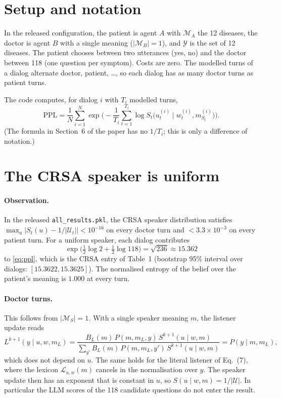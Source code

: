 \documentclass[11pt,a4paper]{article}
\newcommand{\code}[1]{\texttt{\small #1}}
\begin{document}
\section{Setup and notation}

In the released configuration, the patient is agent $A$ with $\mathcal{M}_A$ the 12 diseases, the
doctor is agent $B$ with a single meaning ($|\mathcal{M}_B| = 1$), and $\mathcal{Y}$ is the set of
12 diseases. The patient chooses between two utterances (yes, no) and the doctor between 118
(one question per symptom). Costs are zero. The modelled turns of a dialog
alternate doctor, patient, \dots, so each dialog has as many doctor turns as patient turns.

The code computes, for dialog $i$ with $T_i$ modelled turns,
\begin{equation}
\mathrm{PPL} = \frac{1}{N} \sum_{i=1}^{N} \exp\Big( -\frac{1}{T_i} \sum_{t=1}^{T_i}
\log S_t\big(u_t^{(i)} \mid w_t^{(i)}, m_{S_t}^{(i)}\big) \Big).
\label{eq:ppl}
\end{equation}
(The formula in Section~6 of the paper has no $1/T_i$; this is only a difference of notation.)

\section{The CRSA speaker is uniform}
\label{sec:uniform}

\paragraph{Observation.} In the released \code{all\_results.pkl}, the CRSA speaker distribution
satisfies $\max_u |S_t(u) - 1/|\mathcal{U}_t|| < 10^{-16}$ on every doctor turn and
$< 3.3 \times 10^{-3}$ on every patient turn. For a uniform speaker, each dialog contributes
\[
\exp\big( \tfrac12 \log 2 + \tfrac12 \log 118 \big) = \sqrt{236} \approx 15.362
\]
to \eqref{eq:ppl}, which is the CRSA entry of Table~1 (bootstrap 95\% interval over dialogs:
$[15.3622, 15.3625]$). The normalised entropy of the belief over the patient's meaning is $1.000$ at every turn.

\paragraph{Doctor turns.} This follows from $|\mathcal{M}_S| = 1$. With a single speaker meaning
$m$, the listener update reads
\[
L^{k+1}(y \mid u, w, m_L) = \frac{B_L(m)\, P(m, m_L, y)\, S^{k+1}(u \mid w, m)}
{\sum_{y'} B_L(m)\, P(m, m_L, y')\, S^{k+1}(u \mid w, m)} = P(y \mid m, m_L),
\]
which does not depend on $u$. The same holds for the literal listener of Eq.~(7), where the
lexicon $\mathcal{L}_{u,w}(m)$ cancels in the normalisation over $y$. The speaker update then has
an exponent that is constant in $u$, so $S(u \mid w, m) = 1/|\mathcal{U}|$. In particular the LLM
scores of the 118 candidate questions do not enter the result.
\end{document}
